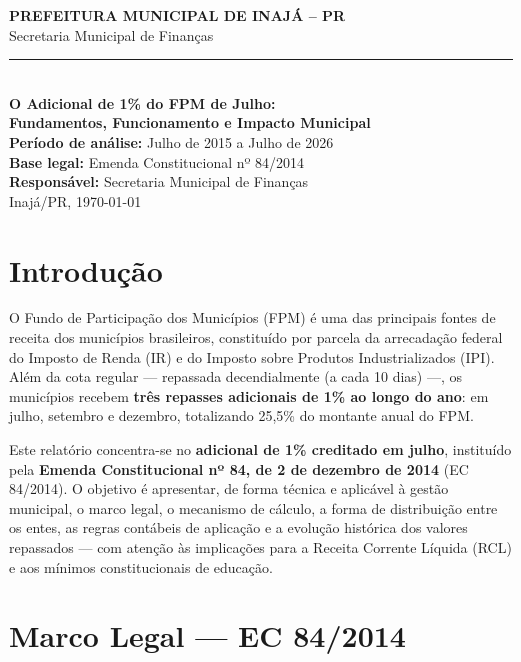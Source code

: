 \documentclass[12pt,a4paper]{article}
\newcommand{\municipio}{Inajá}
\newcommand{\uf}{PR}
\newcommand{\tituloRelatorio}{O Adicional de 1\% do FPM de Julho:\\Fundamentos, Funcionamento e Impacto Municipal}
\newcommand{\responsavel}{Secretaria Municipal de Finanças}
\newcommand{\periodo}{Julho de 2015 a Julho de 2026}
\begin{document}
\begin{titlepage}
  \begin{center}
    \vspace*{2.5cm}
    {\large\textbf{PREFEITURA MUNICIPAL DE \MakeUppercase{\municipio} -- \uf}}\\[0.3cm]
    {\normalsize Secretaria Municipal de Finanças}\\[0.6cm]
    \rule{\textwidth}{0.6pt}\\[1cm]
    {\LARGE\textbf{\tituloRelatorio}}\\[1.5cm]
    {\large\textbf{Período de análise:} \periodo}\\[0.6cm]
    {\large\textbf{Base legal:} Emenda Constitucional nº 84/2014}\\[0.6cm]
    {\large\textbf{Responsável:} \responsavel}\\[2cm]
    \vfill
    {\large \municipio/\uf, \today}
  \end{center}
\end{titlepage}

\tableofcontents
\newpage

\section{Introdução}

O Fundo de Participação dos Municípios (FPM) é uma das principais fontes de receita dos municípios brasileiros, constituído por parcela da arrecadação federal do Imposto de Renda (IR) e do Imposto sobre Produtos Industrializados (IPI). Além da cota regular --- repassada decendialmente (a cada 10 dias) ---, os municípios recebem \textbf{três repasses adicionais de 1\% ao longo do ano}: em julho, setembro e dezembro, totalizando 25,5\% do montante anual do FPM.

Este relatório concentra-se no \textbf{adicional de 1\% creditado em julho}, instituído pela \textbf{Emenda Constitucional nº 84, de 2 de dezembro de 2014} (EC 84/2014). O objetivo é apresentar, de forma técnica e aplicável à gestão municipal, o marco legal, o mecanismo de cálculo, a forma de distribuição entre os entes, as regras contábeis de aplicação e a evolução histórica dos valores repassados --- com atenção às implicações para a Receita Corrente Líquida (RCL) e aos mínimos constitucionais de educação.

\section{Marco Legal --- EC 84/2014}
\end{document}
